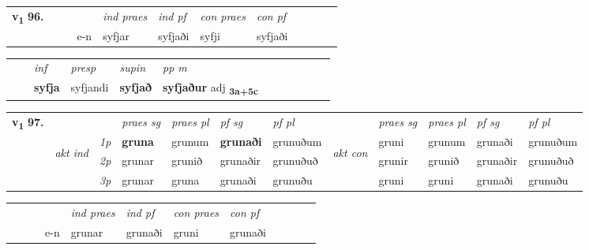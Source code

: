 \begin{tabular}{llllllllllll}\toprule
\multirow{4}{*}{{{\textbf{v{\textsubscript{1}}} \Large{\textbf{96.}}}}}  & &  & &  \textit{ind praes} & \textit{ind pf} & \textit{con praes} & \textit{con pf} \\*
&  & & e-n & syfjar & syfjaði & syfji & syfjaði \\*
\cmidrule{5-9}
\end{tabular}


\begin{tabular}{llllllllllll}
 & & \textit{inf}     & \textit{presp} & \textit{supin}  & \textit{pp m}     \\*
  & & \textbf{syfja}      & syfjandi &  \textbf{syfjað}  & \textbf{syfjaður} adj \textbf{\textsubscript{3a+5c}} \\*
\cmidrule{1-12}
\end{tabular}



\begin{tabular}{llllllllllll} \toprule
\multirow{4}{*}{{{\textbf{v{\textsubscript{1}}} \Large{\textbf{97.}}}}}  & &   &  \textit{praes sg}  & \textit{praes pl}  &\textit{ pf sg} & \textit{pf pl} &  &  \textit{praes sg}  & \textit{praes pl}  & \textit{pf sg} & \textit{pf pl } \\*
	\cmidrule{4-7} \cmidrule{9-12}
 & \multirow{3}{*}{\begin{turn}{90}\textit{akt ind}\end{turn}} & {\textit{1p}} & \textbf{gruna} & grunum    & \textbf{grunaði} & grunuðum & \multirow{3}{*}{\begin{turn}{90}\textit{akt con}\end{turn}} &gruni & grunum & grunaði & grunuðum\\*
& &  {\textit{2p}} &  grunar  & grunið   & grunaðir & grunuðuð & & grunir & grunið & grunaðir & grunuðuð \\*
& &  {\textit{3p}} & grunar & gruna   & grunaði & grunuðu & & gruni & gruni& grunaði & grunuðu  \\*
\cmidrule{4-7} \cmidrule{9-12}
\end{tabular}


\begin{tabular}{llllllllllll}
 & &  & &  \textit{ind praes} & \textit{ind pf} & \textit{con praes} & \textit{con pf} \\*
&  & & e-n & grunar & grunaði & gruni & grunaði \\*
\cmidrule{5-9}
\end{tabular}


